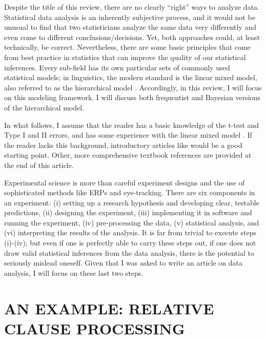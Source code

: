 \documentclass{ar-1col}\usepackage[]{graphicx}\usepackage[]{color}
\begin{document}
Despite the title of this review, there are no clearly ``right'' ways to analyze data. Statistical data analysis is an inherently subjective process, and it would not be unusual to find that two statisticians analyze the same data very differently and even come to different conclusions/decisions. Yet, both approaches could, at least technically, be correct. Nevertheless, there are some basic principles that come from best practice in statistics that can improve the quality of our statistical inferences. Every sub-field has its own particular sets of commonly used statistical models; in linguistics, the modern standard is the linear mixed model, also referred to as the hierarchical model \citep{pinheirobates}.  Accordingly, in this review, I will focus on this modeling framework. I will discuss both frequentist and Bayesian versions of the hierarchical model.

In what follows, I assume that the reader has a basic knowledge of the t-test and Type I and II errors, and has some experience with the linear mixed model \citep{lme4new}. If the reader lacks this background,  introductory articles like \citet{baayen2008mixed,VasishthNicenboimStatMeth,VasishthBeckmanetal} would be a good starting point. Other, more comprehensive textbook references are provided at the end of this article.


Experimental science is more than careful experiment designs and the use of sophisticated methods like ERPs and eye-tracking. There are six components in an experiment: (i) setting up a research hypothesis and developing clear, testable predictions, (ii) designing the experiment, (iii) implementing it in software and running the experiment, (iv) pre-processing the data, (v) statistical analysis, and (vi) interpreting the results of the analysis.  It is far from trivial to execute steps (i)-(iv); but even if one is perfectly able to carry these steps out, if one does not draw valid statistical inferences from the data analysis, 
there is the potential to seriously mislead oneself. Given that I was asked to write an article on data analysis, I will focus on these last two steps.



\section{AN EXAMPLE: RELATIVE CLAUSE PROCESSING}
\end{document}
